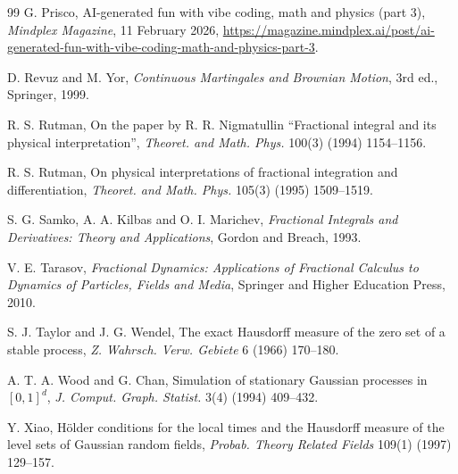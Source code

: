 \documentclass[11pt]{article}
\theoremstyle{remark}
\theoremstyle{definition}
\begin{document}
\begin{thebibliography}{99}
 G. Prisco, AI-generated fun with vibe coding, math and physics (part 3), \emph{Mindplex Magazine}, 11 February 2026, \url{https://magazine.mindplex.ai/post/ai-generated-fun-with-vibe-coding-math-and-physics-part-3}.

 D. Revuz and M. Yor, \emph{Continuous Martingales and Brownian Motion}, 3rd ed., Springer, 1999.

 R. S. Rutman, On the paper by R. R. Nigmatullin ``Fractional integral and its physical interpretation'', \emph{Theoret. and Math. Phys.} 100(3) (1994) 1154--1156.

 R. S. Rutman, On physical interpretations of fractional integration and differentiation, \emph{Theoret. and Math. Phys.} 105(3) (1995) 1509--1519.

 S. G. Samko, A. A. Kilbas and O. I. Marichev, \emph{Fractional Integrals and Derivatives: Theory and Applications}, Gordon and Breach, 1993.

 V. E. Tarasov, \emph{Fractional Dynamics: Applications of Fractional Calculus to Dynamics of Particles, Fields and Media}, Springer and Higher Education Press, 2010.

 S. J. Taylor and J. G. Wendel, The exact Hausdorff measure of the zero set of a stable process, \emph{Z. Wahrsch. Verw. Gebiete} 6 (1966) 170--180.

 A. T. A. Wood and G. Chan, Simulation of stationary Gaussian processes in $[0,1]^d$, \emph{J. Comput. Graph. Statist.} 3(4) (1994) 409--432.

 Y. Xiao, H\"older conditions for the local times and the Hausdorff measure of the level sets of Gaussian random fields, \emph{Probab. Theory Related Fields} 109(1) (1997) 129--157.

\end{thebibliography}
\end{document}
